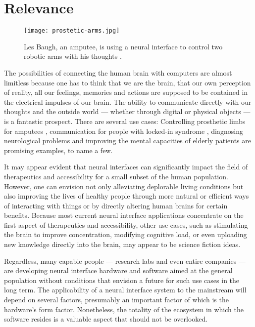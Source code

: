 \section{Relevance}
\label{chapter1-relevance}

\begin{figure}
  \centering
  \texttt{[image: prostetic-arms.jpg]}
  \caption{Les Baugh, an amputee, is using a neural interface to control two robotic arms with his thoughts \citep{campbell_amputee_2014}.}
  \label{fig:prostetic-arms}
\end{figure}

The possibilities of connecting the human brain with computers are almost limitless because one has to think that we are the brain, that our own perception of reality, all our feelings, memories and actions are supposed to be contained in the electrical impulses of our brain. The ability to communicate directly with our thoughts and the outside world — whether through digital or physical objects — is a fantastic prospect. There are several use cases: Controlling prosthetic limbs for amputees \citep{murphy_electroencephalogram-based_2017}, communication for people with locked-in syndrome \citep{chaudhary_spelling_2022}, diagnosing neurological problems and improving the mental capacities of elderly patients \citep{belkacem_brain_2020} are promising examples, to name a few.

It may appear evident that neural interfaces can significantly impact the field of therapeutics and accessibility for a small subset of the human population. However, one can envision not only alleviating deplorable living conditions but also improving the lives of healthy people through more natural or efficient ways of interacting with things or by directly altering human brains for certain benefits. Because most current neural interface applications concentrate on the first aspect of therapeutics and accessibility, other use cases, such as stimulating the brain to improve concentration, modifying cognitive load, or even uploading new knowledge directly into the brain, may appear to be science fiction ideas.

Regardless, many capable people — research labs and even entire companies — are developing neural interface hardware and software aimed at the general population without conditions that envision a future for such use cases in the long term. The applicability of a neural interface system to the mainstream will depend on several factors, presumably an important factor of which is the hardware's form factor. Nonetheless, the totality of the ecosystem in which the software resides is a valuable aspect that should not be overlooked.

